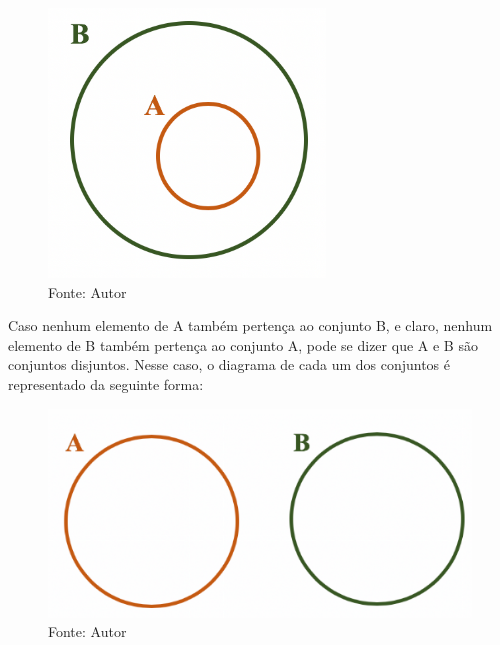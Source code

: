 \begin{multicols*}{2}
	\begin{figure}[H]
		\centering
		\includegraphics[width=\columnwidth]{assets/Conjunto Contido.png}
		\caption*{Fonte: Autor}
	\end{figure}


	Caso nenhum elemento de A também pertença ao conjunto B, e claro, nenhum elemento de B também pertença ao conjunto A, pode se dizer que A e B são conjuntos disjuntos. Nesse caso, o diagrama de cada um dos conjuntos é representado da seguinte forma:\\

	\begin{figure}[H]
		\centering
		\includegraphics[width=\columnwidth]{assets/Conjunto Disjunto.png}
		\caption*{Fonte: Autor}
	\end{figure}


\end{multicols*}
